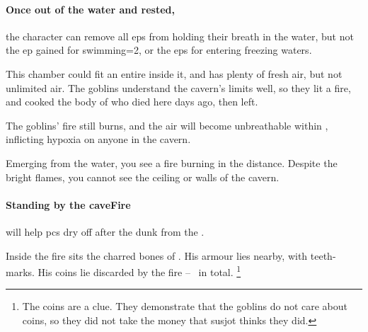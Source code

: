 \begin{multicols}{2}
\paragraph{Once out of the water and rested,}
the character can remove all \glspl{ep} from holding their breath in the water, but not the \gls{ep} gained for swimming\ifnum\value{temperature}=2\else, or the \glspl{ep} for entering freezing waters\fi.



\vspace{14em}


\begin{exampletext}
  This chamber could fit an entire  inside it, and has plenty of fresh air, but not unlimited air.
  The goblins understand the cavern's limits well, so they lit a fire, and cooked the body of  who died here days ago, then left.
\end{exampletext}

The goblins' fire still burns, and the air will become unbreathable within , inflicting \gls{hypoxia} on anyone in the cavern.

\begin{boxtext}
  Emerging from the water, you see a fire burning in the distance.
  Despite the bright flames, you cannot see the ceiling or walls of the cavern.
\end{boxtext}

\paragraph{Standing by the \gls{caveFire}}
will help \glspl{pc} dry off after the dunk from the .

Inside the fire sits the charred bones of .
His armour lies nearby, with teeth-marks.
His coins lie discarded by the fire -- \lootSmall\ in total.%
\footnote{The coins are a clue.  They demonstrate that the goblins do not care about coins, so they did not take the money that \gls{susjot} thinks they did.}
\label{caveCoinsII}
\setcounter{diceNo}{0}%
\renewcommand\npcsymbol{\currency}


\end{multicols}
